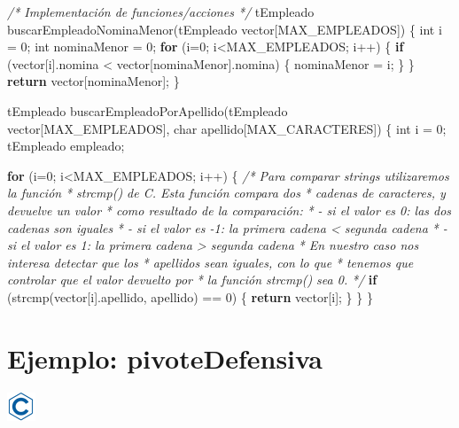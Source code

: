 \documentclass[
]{book}
\newenvironment{Shaded}{\begin{snugshade}}{\end{snugshade}}
\newcommand{\CommentTok}[1]{\textcolor[rgb]{0.56,0.35,0.01}{\textit{#1}}}
\newcommand{\ControlFlowTok}[1]{\textcolor[rgb]{0.13,0.29,0.53}{\textbf{#1}}}
\newcommand{\DataTypeTok}[1]{\textcolor[rgb]{0.13,0.29,0.53}{#1}}
\newcommand{\DecValTok}[1]{\textcolor[rgb]{0.00,0.00,0.81}{#1}}
\newcommand{\NormalTok}[1]{#1}
\begin{document}
\begin{Shaded}
\begin{Highlighting}[]
\CommentTok{/* Implementación de funciones/acciones */}
\NormalTok{tEmpleado buscarEmpleadoNominaMenor(tEmpleado vector[MAX\_EMPLEADOS]) \{}
    \DataTypeTok{int}\NormalTok{ i = }\DecValTok{0}\NormalTok{; }
    \DataTypeTok{int}\NormalTok{ nominaMenor = }\DecValTok{0}\NormalTok{;}
    \ControlFlowTok{for}\NormalTok{ (i=}\DecValTok{0}\NormalTok{; i\textless{}MAX\_EMPLEADOS; i++) \{}
        \ControlFlowTok{if}\NormalTok{ (vector[i].nomina \textless{} vector[nominaMenor].nomina) \{}
\NormalTok{            nominaMenor = i;}
\NormalTok{        \}}
\NormalTok{    \}}
    \ControlFlowTok{return}\NormalTok{ vector[nominaMenor];}
\NormalTok{\}}

\NormalTok{tEmpleado buscarEmpleadoPorApellido(tEmpleado vector[MAX\_EMPLEADOS], }\DataTypeTok{char}\NormalTok{ apellido[MAX\_CARACTERES]) \{}
    \DataTypeTok{int}\NormalTok{ i = }\DecValTok{0}\NormalTok{; }
\NormalTok{    tEmpleado empleado;}
    
    \ControlFlowTok{for}\NormalTok{ (i=}\DecValTok{0}\NormalTok{; i\textless{}MAX\_EMPLEADOS; i++) \{}
        \CommentTok{/* Para comparar strings utilizaremos la función}
\CommentTok{         * strcmp() de C. Esta función compara dos}
\CommentTok{         * cadenas de caracteres, y devuelve un valor}
\CommentTok{         * como resultado de la comparación:}
\CommentTok{         * {-} si el valor es 0: las dos cadenas son iguales}
\CommentTok{         * {-} si el valor es {-}1: la primera cadena \textless{} segunda cadena}
\CommentTok{         * {-} si el valor es 1: la primera cadena \textgreater{} segunda cadena}
\CommentTok{         * En nuestro caso nos interesa detectar que los}
\CommentTok{         * apellidos sean iguales, con lo que }
\CommentTok{         * tenemos que controlar que el valor devuelto por}
\CommentTok{         * la función strcmp() sea 0.}
\CommentTok{         */}
        \ControlFlowTok{if}\NormalTok{ (strcmp(vector[i].apellido, apellido) == }\DecValTok{0}\NormalTok{) \{}
            \ControlFlowTok{return}\NormalTok{ vector[i];}
\NormalTok{        \}}
\NormalTok{    \}}
\NormalTok{\}}
\end{Highlighting}
\end{Shaded}

\hypertarget{pivoteDefensiva}{%
\section{Ejemplo: pivoteDefensiva}\label{pivoteDefensiva}}

\includegraphics{./img/c.png}
\end{document}
